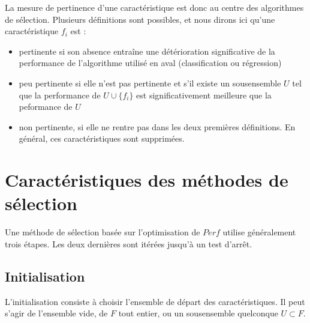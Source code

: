 \documentclass[letterpaper,10pt,english]{jupyterBook}
\begin{document}
\sphinxAtStartPar
La mesure de pertinence d’une caractéristique est donc au centre des algorithmes de sélection. Plusieurs définitions sont possibles, et nous dirons ici  qu’une caractéristique \(f_i\) est :
\begin{itemize}
\item {} 
\sphinxAtStartPar
pertinente si son absence entraîne une détérioration significative de la performance de l’algorithme utilisé en aval (classification ou régression)

\item {} 
\sphinxAtStartPar
peu pertinente si elle n’est pas pertinente et s’il existe un sous\sphinxhyphen{}ensemble \(U\) tel que la performance de \(U\cup\{f_i\}\) est significativement meilleure que la peformance de \(U\)

\item {} 
\sphinxAtStartPar
non pertinente, si elle ne rentre pas dans les deux premières définitions. En général, ces caractéristiques sont supprimées.

\end{itemize}


\section{Caractéristiques des méthodes de sélection}
\label{\detokenize{selection:caracteristiques-des-methodes-de-selection}}
\sphinxAtStartPar
Une méthode de sélection basée sur l’optimisation de \(Perf\) utilise généralement trois étapes. Les  deux dernières sont itérées jusqu’à un test d’arrêt.


\subsection{Initialisation}
\label{\detokenize{selection:initialisation}}
\sphinxAtStartPar
L’initialisation consiste à choisir l’ensemble de départ des caractéristiques. Il peut s’agir de l’ensemble vide, de \(F\) tout entier, ou un sous\sphinxhyphen{}ensemble quelconque \(U\subset F\).
\end{document}
